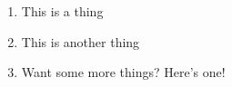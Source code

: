 \documentclass{article}
\begin{document}
\begin{enumerate}
\item This is a thing
\item This is another thing
\item Want some more things? Here's one!
\end{enumerate}
\end{document}
